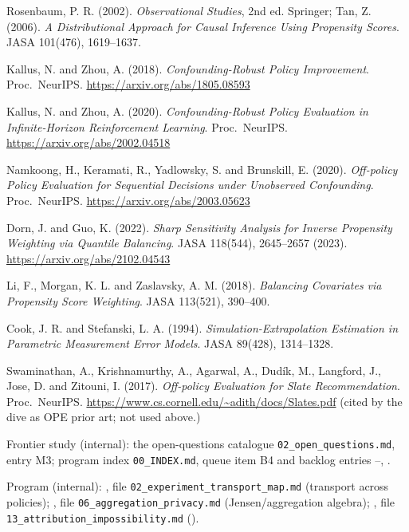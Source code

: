 \begin{enumerate}[label={[\arabic*]},leftmargin=2.5em]
\item Rosenbaum, P. R. (2002). \emph{Observational Studies}, 2nd ed. Springer; Tan, Z. (2006). \emph{A Distributional Approach for Causal Inference Using Propensity Scores}. JASA 101(476), 1619--1637.
\item Kallus, N. and Zhou, A. (2018). \emph{Confounding-Robust Policy Improvement}. Proc.\ NeurIPS. \url{https://arxiv.org/abs/1805.08593}
\item Kallus, N. and Zhou, A. (2020). \emph{Confounding-Robust Policy Evaluation in Infinite-Horizon Reinforcement Learning}. Proc.\ NeurIPS. \url{https://arxiv.org/abs/2002.04518}
\item Namkoong, H., Keramati, R., Yadlowsky, S. and Brunskill, E. (2020). \emph{Off-policy Policy Evaluation for Sequential Decisions under Unobserved Confounding}. Proc.\ NeurIPS. \url{https://arxiv.org/abs/2003.05623}
\item Dorn, J. and Guo, K. (2022). \emph{Sharp Sensitivity Analysis for Inverse Propensity Weighting via Quantile Balancing}. JASA 118(544), 2645--2657 (2023). \url{https://arxiv.org/abs/2102.04543}
\item Li, F., Morgan, K. L. and Zaslavsky, A. M. (2018). \emph{Balancing Covariates via Propensity Score Weighting}. JASA 113(521), 390--400.
\item Cook, J. R. and Stefanski, L. A. (1994). \emph{Simulation-Extrapolation Estimation in Parametric Measurement Error Models}. JASA 89(428), 1314--1328.
\item Swaminathan, A., Krishnamurthy, A., Agarwal, A., Dud\'ik, M., Langford, J., Jose, D. and Zitouni, I. (2017). \emph{Off-policy Evaluation for Slate Recommendation}. Proc.\ NeurIPS. \url{https://www.cs.cornell.edu/~adith/docs/Slates.pdf} (cited by the dive as OPE prior art; not used above.)
\item Frontier study (internal): the open-questions catalogue \texttt{02\_open\_questions.md}, entry M3; program index \texttt{00\_INDEX.md}, queue item B4 and backlog entries --, .
\item Program (internal): , file \texttt{02\_experiment\_transport\_map.md} (transport across policies); , file \texttt{06\_aggregation\_privacy.md} (Jensen/aggregation algebra); , file \texttt{13\_attribution\_impossibility.md} ().
\end{enumerate}
\endgroup
